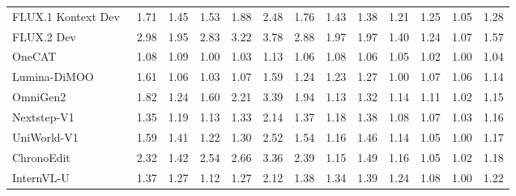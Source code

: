 \begin{table}[t]
{\begin{tabular}{l|cccccc|cccccc}
            FLUX.1 Kontext Dev~\cite{labs2025flux}
            & 1.71 & 1.45 & 1.53 & 1.88 & 2.48 & \cellcolor[HTML]{C8C8C8}1.76 & 1.43 & 1.38 & 1.21 & 1.25 & 1.05
            & \cellcolor[HTML]{C8C8C8}1.28 \\

            FLUX.2 Dev~\cite{flux-2-2025}
            & 2.98 & 1.95 & 2.83 & 3.22 & 3.78 & \cellcolor[HTML]{C8C8C8} 2.88 & 1.97 & 1.97 & 1.40 & 1.24 & 1.07
            & \cellcolor[HTML]{C8C8C8} 1.57  \\

            \midrule

            OneCAT~\cite{li2025onecat}
            & 1.08 & 1.09 & 1.00 & 1.03 & 1.13 & \cellcolor[HTML]{C8C8C8}1.06 & 1.08 & 1.06 & 1.05 & 1.02 & 1.00
            & \cellcolor[HTML]{C8C8C8}1.04 \\

            Lumina-DiMOO~\cite{xin2025lumina}
            & 1.61 & 1.06 & 1.03 & 1.07 & 1.59 & \cellcolor[HTML]{C8C8C8}1.24  & 1.23 & 1.27 & 1.00 & 1.07 & 1.06
            & \cellcolor[HTML]{C8C8C8}1.14  \\

            OmniGen2~\cite{wu2025omnigen2}
            & 1.82 & 1.24 & 1.60 & 2.21 & 3.39 & \cellcolor[HTML]{C8C8C8}1.94 & 1.13 & 1.32 & 1.14 & 1.11 & 1.02
            & \cellcolor[HTML]{C8C8C8}1.15 \\

            Nextstep-V1~\cite{han2025nextstep}
            & 1.35 & 1.19 & 1.13 & 1.33 & 2.14 & \cellcolor[HTML]{C8C8C8}1.37 & 1.18 & 1.38 & 1.08 & 1.07 & 1.03
            & \cellcolor[HTML]{C8C8C8}1.16 \\

            UniWorld-V1~\cite{lin2025uniworld}
            & 1.59 & 1.41 & 1.22 & 1.30 & 2.52 & \cellcolor[HTML]{C8C8C8}1.54 & 1.16 & 1.46 & 1.14 & 1.05 & 1.00
            & \cellcolor[HTML]{C8C8C8}1.17 \\

            ChronoEdit~\cite{wu2025chronoedit}
            & 2.32 & 1.42 & 2.54 & 2.66 & 3.36 & \cellcolor[HTML]{C8C8C8}2.39 & 1.15 & 1.49 & 1.16 & 1.05 & 1.02
            & \cellcolor[HTML]{C8C8C8}1.18 \\

            InternVL-U~\cite{tian2026internvl}
            & 1.37 & 1.27 & 1.12 & 1.27 & 2.12 & \cellcolor[HTML]{C8C8C8}1.38 & 1.34 & 1.39 & 1.24 & 1.08 & 1.00
            & \cellcolor[HTML]{C8C8C8}1.22 \\


\end{tabular}}
\end{table}
